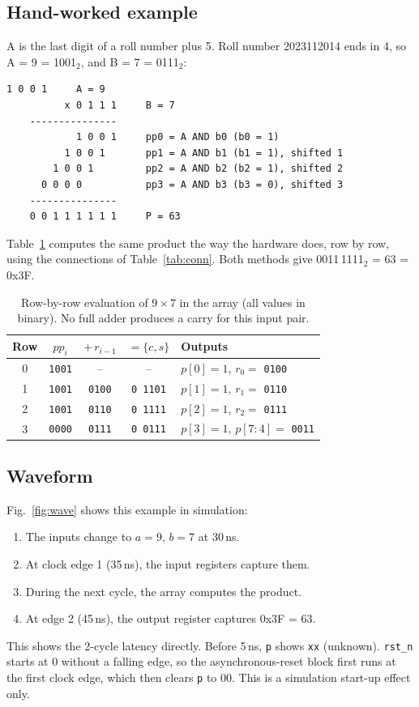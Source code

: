 \documentclass[10pt,a4paper,twocolumn]{article}
\begin{document}
\subsection{Hand-worked example}
A is the last digit of a roll number plus 5. Roll number 2023112014 ends in 4, so A = 9 = 1001$_2$, and B = 7 = 0111$_2$:
\begin{lstlisting}[basicstyle=\ttfamily\scriptsize]
            1 0 0 1     A = 9
          x 0 1 1 1     B = 7
    ---------------
            1 0 0 1     pp0 = A AND b0 (b0 = 1)
          1 0 0 1       pp1 = A AND b1 (b1 = 1), shifted 1
        1 0 0 1         pp2 = A AND b2 (b2 = 1), shifted 2
      0 0 0 0           pp3 = A AND b3 (b3 = 0), shifted 3
    ---------------
    0 0 1 1 1 1 1 1     P = 63
\end{lstlisting}
Table~\ref{tab:hand} computes the same product the way the hardware does, row by row, using the connections of Table~\ref{tab:conn}. Both methods give 0011\,1111$_2$ = 63 = 0x3F.

\begin{table}[!htbp]
\centering\footnotesize
\begin{tabular}{ccccl}
\toprule
\textbf{Row} & $pp_i$ & $+\,r_{i-1}$ & $=\{c, s\}$ & \textbf{Outputs} \\
\midrule
0 & \texttt{1001} & -- & -- & $p[0]=1$, $r_0=$ \texttt{0100} \\
1 & \texttt{1001} & \texttt{0100} & \texttt{0 1101} & $p[1]=1$, $r_1=$ \texttt{0110} \\
2 & \texttt{1001} & \texttt{0110} & \texttt{0 1111} & $p[2]=1$, $r_2=$ \texttt{0111} \\
3 & \texttt{0000} & \texttt{0111} & \texttt{0 0111} & $p[3]=1$, $p[7{:}4]=$ \texttt{0011} \\
\bottomrule
\end{tabular}
\caption{Row-by-row evaluation of $9 \times 7$ in the array (all values in binary). No full adder produces a carry for this input pair.}
\label{tab:hand}
\end{table}

\subsection{Waveform}
Fig.~\ref{fig:wave} shows this example in simulation:
\begin{enumerate}
  \item The inputs change to $a = 9$, $b = 7$ at 30\,ns.
  \item At clock edge 1 (35\,ns), the input registers capture them.
  \item During the next cycle, the array computes the product.
  \item At edge 2 (45\,ns), the output register captures 0x3F = 63.
\end{enumerate}
This shows the 2-cycle latency directly. Before 5\,ns, \texttt{p} shows \texttt{xx} (unknown). \texttt{rst\_n} starts at 0 without a falling edge, so the asynchronous-reset block first runs at the first clock edge, which then clears \texttt{p} to 00. This is a simulation start-up effect only.
\end{document}
